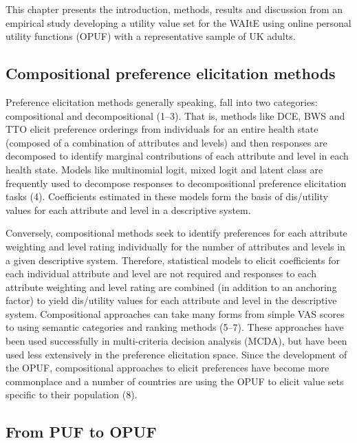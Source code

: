 \documentclass[
  letterpaper,
  DIV=11,
  numbers=noendperiod]{scrartcl}
\begin{document}
This chapter presents the introduction, methods, results and discussion
from an empirical study developing a utility value set for the WAItE
using online personal utility functions (OPUF) with a representative
sample of UK adults.

\subsection{Compositional preference elicitation
methods}\label{compositional-preference-elicitation-methods}

Preference elicitation methods generally speaking, fall into two
categories: compositional and decompositional (1--3). That is, methods
like DCE, BWS and TTO elicit preference orderings from individuals for
an entire health state (composed of a combination of attributes and
levels) and then responses are decomposed to identify marginal
contributions of each attribute and level in each health state. Models
like multinomial logit, mixed logit and latent class are frequently used
to decompose responses to decompositional preference elicitation tasks
(4). Coefficients estimated in these models form the basis of
dis/utility values for each attribute and level in a descriptive system.

Conversely, compositional methods seek to identify preferences for each
attribute weighting and level rating individually for the number of
attributes and levels in a given descriptive system. Therefore,
statistical models to elicit coefficients for each individual attribute
and level are not required and responses to each attribute weighting and
level rating are combined (in addition to an anchoring factor) to yield
dis/utility values for each attribute and level in the descriptive
system. Compositional approaches can take many forms from simple VAS
scores to using semantic categories and ranking methods (5--7). These
approaches have been used successfully in multi-criteria decision
analysis (MCDA), but have been used less extensively in the preference
elicitation space. Since the development of the OPUF, compositional
approaches to elicit preferences have become more commonplace and a
number of countries are using the OPUF to elicit value sets specific to
their population (8).

\subsection{From PUF to OPUF}\label{from-puf-to-opuf}
\end{document}
